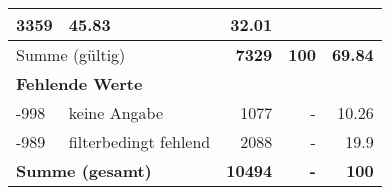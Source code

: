 \begin{longtable}{lXrrr}
       \num{3359} &
       \num[round-mode=places,round-precision=2]{45.83} &
         \num[round-mode=places,round-precision=2]{32.01} \\
     \midrule
     \multicolumn{2}{l}{Summe (gültig)} &
       \textbf{\num{7329}} &
     \textbf{\num{100}} &
       \textbf{\num[round-mode=places,round-precision=2]{69.84}} \\
     \multicolumn{5}{l}{\textbf{Fehlende Werte}}\\
       -998 &
       keine Angabe &
         \num{1077} &
        - &
         \num[round-mode=places,round-precision=2]{10.26} \\
       -989 &
       filterbedingt fehlend &
         \num{2088} &
        - &
         \num[round-mode=places,round-precision=2]{19.9} \\
     \midrule
     \multicolumn{2}{l}{\textbf{Summe (gesamt)}} &
          \textbf{\num{10494}} &
        \textbf{-} &
        \textbf{\num{100}} \\
     \bottomrule
     \end{longtable}
     

